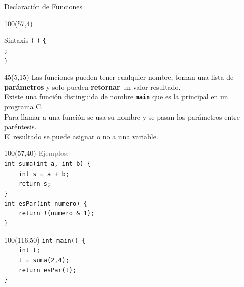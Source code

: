 \documentclass[aspectratio=169]{beamer}
\begin{document}
\begin{frame}[fragile,t]{Declaración de Funciones}
    \begin{textblock}{100}(57,4)
    \begin{block}{\small Sintaxis}
    \vspace{0.2cm}
    \scriptsize
     \hspace{0.2cm}  {\large \texttt{(}}  {\large \texttt{)}}
    {\large \texttt{\{}}\\ \vspace{0.2cm}
    \hspace{3.19cm}  {\large \texttt{;}}\\ \vspace{0.2cm}
    \hspace{2cm} {\large \texttt{\}}}
    \end{block}
    \end{textblock}
    \begin{textblock}{45}(5,15)
    Las funciones pueden tener cualquier nombre, toman una lista de \textbf{parámetros} y solo pueden \textbf{retornar} un valor resultado.\\
    \bigskip
    Existe una función distinguida de nombre \textbf{\texttt{main}} que es la principal en un programa C.\\
    \bigskip
    Para llamar a una función se usa su nombre y se pasan los parámetros entre paréntesis.\\
    El resultado se puede asignar o no a una variable.\\
    \end{textblock}
    \begin{textblock}{100}(57,40)
    \textcolor{gray}{Ejemplos:}\\
    \bigskip
    \normalsize \verb|int suma(int a, int b) {|\\
    \normalsize \verb|    int s = a + b;|\\
    \normalsize \verb|    return s;|\\
    \normalsize \verb|}|\\
    \bigskip
    \normalsize \verb|int esPar(int numero) {|\\
    \normalsize \verb|    return !(numero & 1);|\\
    \normalsize \verb|}|\\
    \end{textblock}
    \begin{textblock}{100}(116,50)
    \normalsize \verb|int main() {|\\
    \normalsize \verb|    int t;|\\
    \normalsize \verb|    t = suma(2,4);|\\
    \normalsize \verb|    return esPar(t);|\\
    \normalsize \verb|}|\\
    \end{textblock}
\end{frame}
\end{document}
